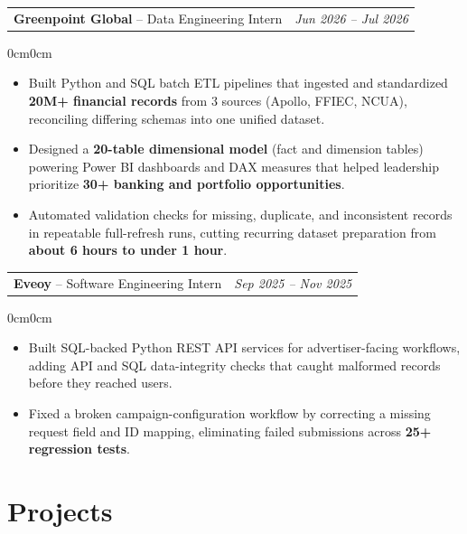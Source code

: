 \documentclass[10pt,letterpaper]{article}
\newenvironment{highlights}{
  \begin{itemize}[
    topsep=0.015cm,
    parsep=0cm,
    partopsep=0pt,
    itemsep=0.01cm,
    leftmargin=12pt
  ]
}{
  \end{itemize}
}
\newenvironment{onecolentry}{
  \begin{adjustwidth}{0cm}{0cm}
}{
  \end{adjustwidth}
}
\begin{document}
\vspace{0.04cm}
 
\begin{tabularx}{\textwidth}{Xr}
  \textbf{Greenpoint Global} -- Data Engineering Intern
  & \textit{Jun 2026 -- Jul 2026}
\end{tabularx}
 
\begin{onecolentry}
\begin{highlights}
  \item Built Python and SQL batch ETL pipelines that ingested and standardized \textbf{20M+ financial records} from 3 sources (Apollo, FFIEC, NCUA), reconciling differing schemas into one unified dataset.
  \item Designed a \textbf{20-table dimensional model} (fact and dimension tables) powering Power BI dashboards and DAX measures that helped leadership prioritize \textbf{30+ banking and portfolio opportunities}.
  \item Automated validation checks for missing, duplicate, and inconsistent records in repeatable full-refresh runs, cutting recurring dataset preparation from \textbf{about 6 hours to under 1 hour}.
\end{highlights}
\end{onecolentry}
 
\vspace{0.04cm}
 
\begin{tabularx}{\textwidth}{Xr}
  \textbf{Eveoy} -- Software Engineering Intern
  & \textit{Sep 2025 -- Nov 2025}
\end{tabularx}
 
\begin{onecolentry}
\begin{highlights}
  \item Built SQL-backed Python REST API services for advertiser-facing workflows, adding API and SQL data-integrity checks that caught malformed records before they reached users.
  \item Fixed a broken campaign-configuration workflow by correcting a missing request field and ID mapping, eliminating failed submissions across \textbf{25+ regression tests}.
\end{highlights}
\end{onecolentry}
 
\section{Projects}
 
\end{document}

